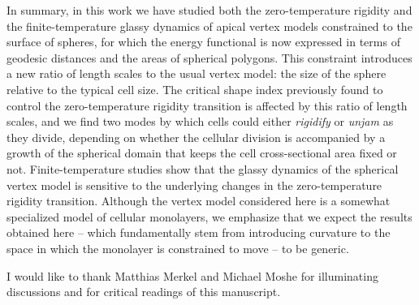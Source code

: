 \documentclass[aps,pre,reprint,superscriptaddress,nofootinbib]{revtex4-2}
\begin{document}
In summary, in this work we have studied both the zero-temperature rigidity and the finite-temperature glassy dynamics of apical vertex models constrained to the surface of spheres, for which the energy functional is now expressed in terms of geodesic distances and the areas of spherical polygons. This constraint introduces a new ratio of length scales to the usual vertex model: the size of the sphere relative to the typical cell size. The critical shape index previously found to control the zero-temperature rigidity transition is affected by this ratio of length scales, and we find two modes by which cells could either \emph{rigidify} or \emph{unjam} as they divide, depending on whether the cellular division is accompanied by a growth of the spherical domain that keeps the cell cross-sectional area fixed or not. Finite-temperature studies show that the glassy dynamics of the spherical vertex model is sensitive to the underlying changes in the zero-temperature rigidity transition. Although the vertex model considered here is a somewhat specialized model of cellular monolayers, we emphasize that we expect the results obtained here -- which fundamentally stem from introducing curvature to the space in which the monolayer is constrained to move -- to be generic.

\begin{acknowledgments}
I would like to thank Matthias Merkel and Michael Moshe for illuminating discussions and for critical readings of this manuscript.
\end{acknowledgments}


\end{document}

